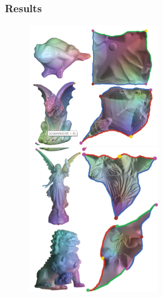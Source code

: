 \documentclass{beamer}
\begin{document}
\begin{frame}
\frametitle{Results}
\begin{figure}
\includegraphics[width=0.5\textwidth]{images/euclidean-results1}
\includegraphics[width=0.5\textwidth]{images/euclidean-results2}
\end{figure}
\end{frame}
\end{document}
